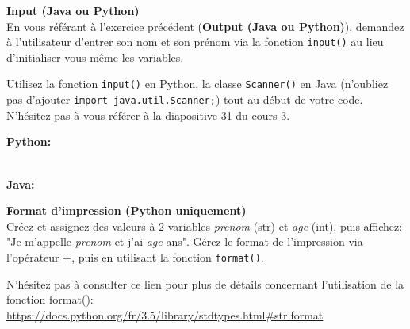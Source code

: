 \begin{Exercice}[5 minutes] \textbf{Input (Java ou Python)}\\
   En vous référant à l'exercice précédent (\textbf{Output (Java ou Python)}), demandez à l'utilisateur d'entrer son nom et son prénom via la fonction \lstinline{input()} au lieu d'initialiser vous-même les variables. \\
   
    \begin{conseil}
       Utilisez la fonction \lstinline{input()} en Python, la classe \lstinline{Scanner()} en Java (n'oubliez pas d'ajouter \lstinline{import java.util.Scanner;}) tout au début de votre code. N'hésitez pas à vous référer à la diapositive 31 du cours 3.
        
    \end{conseil}
    \begin{solution}
    
    \textbf{Python:} 
    
    
    \textbf{\\Java:}
      
       
        
    \end{solution}   
\end{Exercice}

\begin{Exercice}[5 minutes] \textbf{Format d'impression (Python uniquement)}\\
   Créez et assignez des valeurs à 2 variables \textit{prenom} (str) et \textit{age} (int), puis affichez: "Je m'appelle \textit{prenom} et j'ai \textit{age} ans". Gérez le format de l'impression via l'opérateur +, puis en utilisant la fonction \lstinline{format()}. \\
   
    \begin{conseil}
       N'hésitez pas à consulter ce lien pour plus de détails concernant l'utilisation de la fonction format(): \url{
        https://docs.python.org/fr/3.5/library/stdtypes.html\#str.format}
    \end{conseil}
    \begin{solution}
     
    
           
    \end{solution}   
\end{Exercice}

